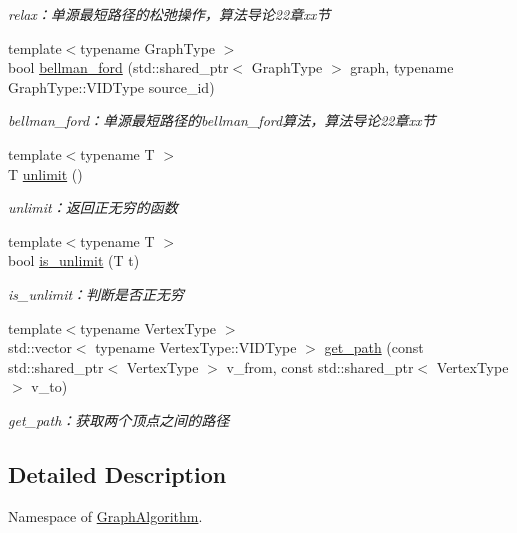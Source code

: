 \begin{DoxyCompactItemize}
\begin{DoxyCompactList}\small\item\em relax：单源最短路径的松弛操作，算法导论22章xx节 \end{DoxyCompactList}\item 
{\footnotesize template$<$typename Graph\+Type $>$ }\\bool \hyperlink{namespace_introduction_to_algorithm_1_1_graph_algorithm_ae96d9b844260ee3ce9225055040c631b}{bellman\+\_\+ford} (std\+::shared\+\_\+ptr$<$ Graph\+Type $>$ graph, typename Graph\+Type\+::\+V\+I\+D\+Type source\+\_\+id)
\begin{DoxyCompactList}\small\item\em bellman\+\_\+ford：单源最短路径的bellman\+\_\+ford算法，算法导论22章xx节 \end{DoxyCompactList}\item 
{\footnotesize template$<$typename T $>$ }\\T \hyperlink{namespace_introduction_to_algorithm_1_1_graph_algorithm_a19237111c3b1ec2717c5e1aefe2f6d9b}{unlimit} ()
\begin{DoxyCompactList}\small\item\em unlimit：返回正无穷的函数 \end{DoxyCompactList}\item 
{\footnotesize template$<$typename T $>$ }\\bool \hyperlink{namespace_introduction_to_algorithm_1_1_graph_algorithm_a4f664c13605fc87ca8d26f4aad5a9fa2}{is\+\_\+unlimit} (T t)
\begin{DoxyCompactList}\small\item\em is\+\_\+unlimit：判断是否正无穷 \end{DoxyCompactList}\item 
{\footnotesize template$<$typename Vertex\+Type $>$ }\\std\+::vector$<$ typename Vertex\+Type\+::\+V\+I\+D\+Type $>$ \hyperlink{namespace_introduction_to_algorithm_1_1_graph_algorithm_a1581960f77507024b39572aeb6d1fbd6}{get\+\_\+path} (const std\+::shared\+\_\+ptr$<$ Vertex\+Type $>$ v\+\_\+from, const std\+::shared\+\_\+ptr$<$ Vertex\+Type $>$ v\+\_\+to)
\begin{DoxyCompactList}\small\item\em get\+\_\+path：获取两个顶点之间的路径 \end{DoxyCompactList}\end{DoxyCompactItemize}


\subsection{Detailed Description}
Namespace of \hyperlink{namespace_introduction_to_algorithm_1_1_graph_algorithm}{Graph\+Algorithm}. 

